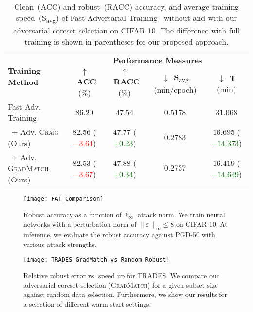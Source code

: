 \documentclass[runningheads]{llncs}
\newcommand{\norm}[1]{\left\lVert#1\right\rVert}
\renewcommand{\textuparrow}{$\uparrow$}
\renewcommand{\textdownarrow}{$\downarrow$}
\begin{document}
\begin{table}[t!]
	\caption{Clean~(ACC) and robust~(RACC) accuracy, and average training speed~(S\textsubscript{avg}) of Fast Adversarial Training~\cite{wong2020fast} without and with our adversarial coreset selection on CIFAR-10.
	         The difference with full training is shown in parentheses for our proposed approach.}
	\label{tab:FAT}
	\begin{center}
		\begin{scriptsize}
		    \setlength\tabcolsep{0.35em}
			\def\arraystretch{1.25}
			\begin{tabular}{lcccc}
				\toprule
				\multirow{2}{*}{\textbf{Training Method}}
				&\multicolumn{4}{c}{\textbf{Performance Measures}}\\
				\cmidrule(lr){2-5}
				&  \textuparrow~\textbf{ACC} (\%)                           & \textuparrow~\textbf{RACC} (\%)                           & \textdownarrow~\textbf{S}\textsubscript{avg} (min/epoch)    & \textdownarrow~\textbf{T} (min)\\
				\midrule
				Fast Adv. Training                & $86.20$                                       & $47.54$                                       &  $0.5178$  &  $31.068$\\
				~+ Adv. \textsc{Craig} (Ours)      & $82.56$ (\textcolor{red}{$-3.64$})            & $47.77$ (\textcolor{darkgreen}{$+0.23$})      &  $0.2783$  &  $16.695$ (\textcolor{darkgreen}{$-14.373$})\\
				~+ Adv. \textsc{GradMatch} (Ours)   & $82.53$ (\textcolor{red}{$-3.67$})            & $47.88$ (\textcolor{darkgreen}{$+0.34$})      &  $0.2737$  &  $16.419$ (\textcolor{darkgreen}{$-14.649$})\\
				\bottomrule
			\end{tabular}
		\end{scriptsize}
	\end{center}
\end{table}
\begin{figure}[tb!]
		\centering
		\begin{minipage}{.38\linewidth}
			    \centering
                \texttt{[image: FAT\_Comparison]}
                \caption{Robust accuracy as a function of $\ell_\infty$ attack norm. We train neural networks with a perturbation norm of $\norm{\varepsilon}_\infty \leq 8$ on CIFAR-10.
                         At inference, we evaluate the robust accuracy against PGD-50 with various attack strengths.}
			\label{fig:fat}
		\end{minipage}
		\hfill
	    \begin{minipage}{.58\linewidth}
			    \centering
                \texttt{[image: TRADES\_GradMatch\_vs\_Random\_Robust]}
                \caption{Relative robust error vs. speed up for TRADES. We compare our adversarial coreset selection (\textsc{GradMatch}) for a given subset size against random data selection.                     Furthermore, we show our results for a selection of different warm-start settings.}
			\label{fig:rand}
		\end{minipage}
\end{figure}
\end{document}

